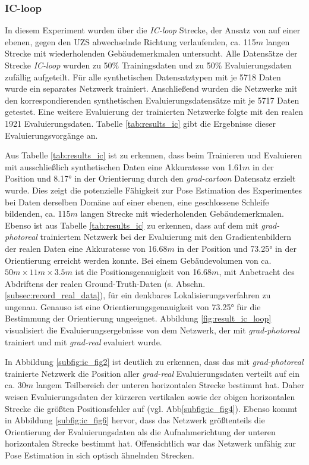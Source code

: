\subsubsection{IC-loop}
In diesem Experiment wurden über die \textit{IC-loop} Strecke, der Ansatz von \citet{acharyaBIMPoseNetIndoorCamera2019} auf einer ebenen, gegen den UZS abwechselnde Richtung verlaufenden, ca. 115$m$ langen Strecke mit wiederholenden Gebäudemerkmalen untersucht. Alle Datensätze der Strecke \textit{IC-loop} wurden zu 50\% Trainingsdaten und zu 50\% Evaluierungsdaten zufällig aufgeteilt. Für alle synthetischen Datensatztypen mit je 5718 Daten wurde ein separates Netzwerk trainiert. Anschließend wurden die Netzwerke mit den korrespondierenden synthetischen Evaluierungsdatensätze mit je 5717 Daten getestet. Eine weitere Evaluierung der trainierten Netzwerke folgte mit den realen 1921 Evaluierungsdaten. Tabelle \ref{tab:results_ic} gibt die Ergebnisse dieser Evaluierungsvorgänge an.

Aus Tabelle \ref{tab:results_ic} ist zu erkennen, dass beim Trainieren und Evaluieren mit ausschließlich synthetischen Daten eine Akkuratesse von 1.61$m$ in der Position und 8.17° in der Orientierung  durch den \textit{grad-cartoon} Datensatz erzielt wurde. Dies zeigt die potenzielle Fähigkeit zur Pose Estimation des Experimentes bei Daten derselben Domäne auf einer ebenen, eine geschlossene Schleife bildenden, ca. 115$m$ langen Strecke mit wiederholenden Gebäudemerkmalen. Ebenso ist aus Tabelle \ref{tab:results_ic} zu erkennen, dass auf dem mit \textit{grad-photoreal} trainiertem Netzwerk bei der Evaluierung mit den Gradientenbildern der realen Daten eine Akkuratesse von 16.68$m$ in der Position und 73.25° in der Orientierung erreicht werden konnte. Bei einem Gebäudevolumen von ca. $50m \times 11m \times 3.5m$ ist die Positionsgenauigkeit von 16.68$m$, mit Anbetracht des Abdriftens der realen Ground-Truth-Daten (s. Abschn. \ref{subsec:record_real_data}), für ein denkbares Lokalisierungsverfahren zu ungenau. Genauso ist eine Orientierungsgenauigkeit von 73.25° für die Bestimmung der Orientierung ungeeignet. Abbildung \ref{fig:result_ic_loop} visualisiert die Evaluierungsergebnisse von dem Netzwerk, der mit \textit{grad-photoreal} trainiert und mit \textit{grad-real} evaluiert wurde.

In Abbildung \ref{subfig:ic_fig2} ist deutlich zu erkennen, dass das mit \textit{grad-photoreal} trainierte Netzwerk die Position aller \textit{grad-real} Evaluierungsdaten verteilt auf ein ca. 30$m$ langem Teilbereich der unteren horizontalen Strecke bestimmt hat. Daher weisen Evaluierungsdaten der kürzeren vertikalen sowie der obigen horizontalen Strecke die größten Positionsfehler auf (vgl. Abb\ref{subfig:ic_fig4}). Ebenso kommt in Abbildung \ref{subfig:ic_fig6} hervor, dass das Netzwerk größtenteils die Orientierung der Evaluierungsdaten als die Aufnahmerichtung der unteren horizontalen Strecke bestimmt hat. Offensichtlich war das Netzwerk unfähig zur Pose Estimation in sich optisch ähnelnden Strecken.

